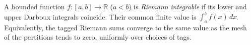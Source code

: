 
A bounded function $f:[a,b]\to\mathbb R$ ($a<b$) is \emph{Riemann integrable} if its lower and upper Darboux integrals coincide. Their common finite value is $\int_a^b f(x)\,dx$. Equivalently, the tagged Riemann sums converge to the same value as the mesh of the partitions tends to zero, uniformly over choices of tags.
